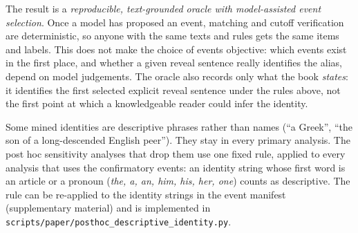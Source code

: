 \documentclass[sn-mathphys]{sn-jnl}%
\theoremstyle{thmstyleone}%
\theoremstyle{thmstyletwo}%
\theoremstyle{thmstylethree}%
\begin{document}
The result is a \emph{reproducible, text-grounded oracle with model-assisted event selection}. Once a model has proposed an event, matching and cutoff verification are deterministic, so anyone with the same texts and rules gets the same items and labels. This does not make the choice of events objective: which events exist in the first place, and whether a given reveal sentence really identifies the alias, depend on model judgements. The oracle also records only what the book \emph{states}: it identifies the first selected explicit reveal sentence under the rules above, not the first point at which a knowledgeable reader could infer the identity.

Some mined identities are descriptive phrases rather than names (``a Greek'', ``the son of a long-descended English peer''). They stay in every primary analysis. The post hoc sensitivity analyses that drop them use one fixed rule, applied to every analysis that uses the confirmatory events: an identity string whose first word is an article or a pronoun (\emph{the, a, an, him, his, her, one}) counts as descriptive. The rule can be re-applied to the identity strings in the event manifest (supplementary material) and is implemented in \texttt{scripts/paper/posthoc\_descriptive\_identity.py}.
\end{document}
